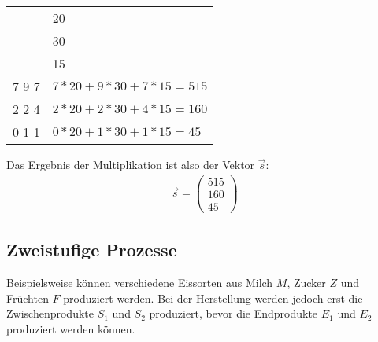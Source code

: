 \begin{center}
\begin{tabular}{r|l}
& \color{red} 20 \\
& \color{green} 30 \\
& \color{blue} 15 \\
\hline
\color{red} 7 \space \color{green} 9 \space \color{blue} 7 & $7*20+9*30+7*15=515$ \\
\color{red} 2 \space \color{green} 2 \space \color{blue} 4 & $2*20+2*30+4*15=160$ \\
\color{red} 0 \space \color{green} 1 \space \color{blue} 1 & $0*20+1*30+1*15=45$
\end{tabular}
\end{center}

\begin{flushleft}
Das Ergebnis der Multiplikation ist also der Vektor $\vec{s}$:
\begin{align}
    \vec{s}=\begin{pmatrix}
        515 \\
        160 \\
        45
    \end{pmatrix}
\end{align}
\end{flushleft}

\subsection{Zweistufige Prozesse}
\label{subsec:2proc}
\begin{flushleft}
Beispielsweise können verschiedene Eissorten aus Milch $M$, Zucker $Z$ und Früchten $F$ produziert werden.
Bei der Herstellung werden jedoch erst die Zwischenprodukte $S_1$ und $S_2$ produziert, bevor die Endprodukte $E_1$ und $E_2$ produziert werden können.
\end{flushleft}

\begin{center}
\end{center}

